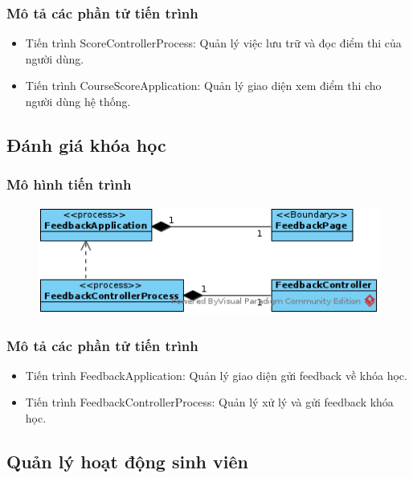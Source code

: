 \documentclass[./../main.tex]{subfiles}
\begin{document}
\subsubsection{Mô tả các phần tử tiến trình}

\begin{itemize}
	\item Tiến trình ScoreControllerProcess: Quản lý việc lưu trữ và đọc điểm thi của người dùng.
	\item Tiến trình CourseScoreApplication: Quản lý giao diện xem điểm thi cho người dùng hệ thống.
\end{itemize}

\subsection{Đánh giá khóa học}

\subsubsection{Mô hình tiến trình}

\begin{figure}[H]
	\centering
	\includegraphics[width=\linewidth]{./images/pv_feedback_course.png}
\end{figure}

\subsubsection{Mô tả các phần tử tiến trình}

\begin{itemize}
	\item Tiến trình FeedbackApplication: Quản lý giao diện gửi feedback về khóa học.
	\item Tiến trình FeedbackControllerProcess: Quản lý xử lý và gửi feedback khóa học.
\end{itemize}

\subsection{Quản lý hoạt động sinh viên}
\end{document}
